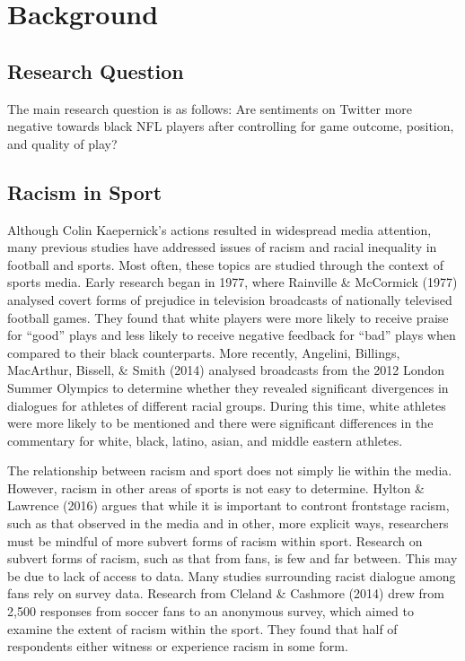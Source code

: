 \documentclass[12pt,twoside]{reedthesis}
\begin{document}
\section{Background}\label{background}

\subsection{Research Question}\label{research-question}

The main research question is as follows: Are sentiments on Twitter more
negative towards black NFL players after controlling for game outcome,
position, and quality of play?

\subsection{Racism in Sport}\label{racism-in-sport}

Although Colin Kaepernick's actions resulted in widespread media
attention, many previous studies have addressed issues of racism and
racial inequality in football and sports. Most often, these topics are
studied through the context of sports media. Early research began in
1977, where Rainville \& McCormick (1977) analysed covert forms of
prejudice in television broadcasts of nationally televised football
games. They found that white players were more likely to receive praise
for ``good'' plays and less likely to receive negative feedback for
``bad'' plays when compared to their black counterparts. More recently,
Angelini, Billings, MacArthur, Bissell, \& Smith (2014) analysed
broadcasts from the 2012 London Summer Olympics to determine whether
they revealed significant divergences in dialogues for athletes of
different racial groups. During this time, white athletes were more
likely to be mentioned and there were significant differences in the
commentary for white, black, latino, asian, and middle eastern athletes.

The relationship between racism and sport does not simply lie within the
media. However, racism in other areas of sports is not easy to
determine. Hylton \& Lawrence (2016) argues that while it is important
to contront frontstage racism, such as that observed in the media and in
other, more explicit ways, researchers must be mindful of more subvert
forms of racism within sport. Research on subvert forms of racism, such
as that from fans, is few and far between. This may be due to lack of
access to data. Many studies surrounding racist dialogue among fans rely
on survey data. Research from Cleland \& Cashmore (2014) drew from 2,500
responses from soccer fans to an anonymous survey, which aimed to
examine the extent of racism within the sport. They found that half of
respondents either witness or experience racism in some form.
\end{document}
